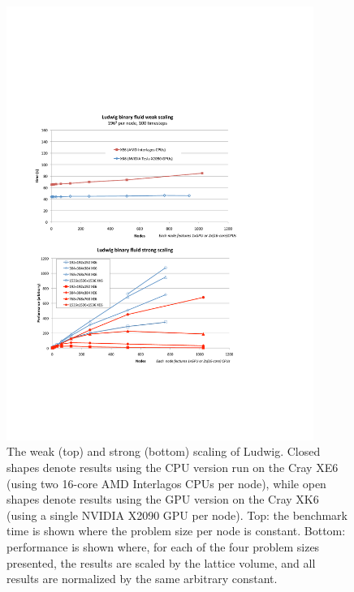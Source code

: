 \begin{figure}[!t]
\centering
\includegraphics[width=10cm]{Chapters/chapter14/figures/two_graphs_ud}
\caption{The weak (top) and strong (bottom) scaling of Ludwig.  Closed
  shapes denote results using the CPU version run on the Cray
  XE6 (using two 16-core AMD Interlagos CPUs per node), while open
  shapes denote results using the GPU version on the Cray XK6 (using a
  single NVIDIA X2090 GPU per node). Top: the benchmark time is shown
  where the problem size per node is constant. Bottom: performance is
  shown where, for each of the four problem sizes presented, the
  results are scaled by the lattice volume, and all results are
  normalized by the same arbitrary constant.  }
\label{ch14:fig:scaling}
\end{figure}



